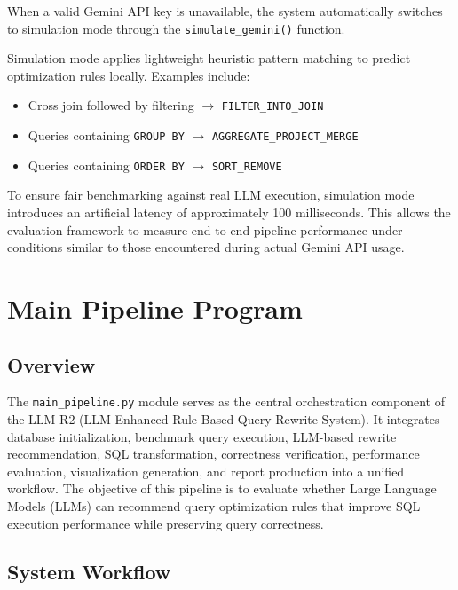 \documentclass[12pt,a4paper]{article}
\begin{document}
When a valid Gemini API key is unavailable, the system automatically
switches to simulation mode through the
\texttt{simulate\_gemini()} function.

Simulation mode applies lightweight heuristic pattern matching to
predict optimization rules locally. Examples include:

\begin{itemize}
    \item Cross join followed by filtering
          $\rightarrow$ \texttt{FILTER\_INTO\_JOIN}
    \item Queries containing \texttt{GROUP BY}
          $\rightarrow$ \texttt{AGGREGATE\_PROJECT\_MERGE}
    \item Queries containing \texttt{ORDER BY}
          $\rightarrow$ \texttt{SORT\_REMOVE}
\end{itemize}

To ensure fair benchmarking against real LLM execution, simulation mode
introduces an artificial latency of approximately 100 milliseconds.
This allows the evaluation framework to measure end-to-end pipeline
performance under conditions similar to those encountered during actual
Gemini API usage.

\newpage

\section{Main Pipeline Program}

\subsection{Overview}

The \texttt{main\_pipeline.py} module serves as the central orchestration component of the LLM-R2 (LLM-Enhanced Rule-Based Query Rewrite System). It integrates database initialization, benchmark query execution, LLM-based rewrite recommendation, SQL transformation, correctness verification, performance evaluation, visualization generation, and report production into a unified workflow. The objective of this pipeline is to evaluate whether Large Language Models (LLMs) can recommend query optimization rules that improve SQL execution performance while preserving query correctness.

\subsection{System Workflow}
\end{document}
